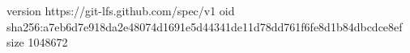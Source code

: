 version https://git-lfs.github.com/spec/v1
oid sha256:a7eb6d7e918da2e48074d1691e5d44341de11d78dd761f6fe8d1b84dbcdce8ef
size 1048672
